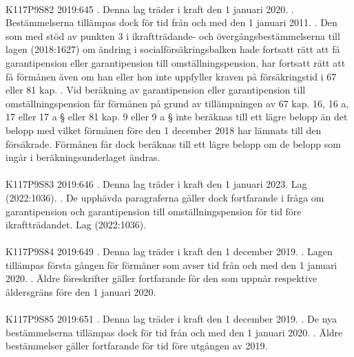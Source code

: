 \documentclass[a4paper,notitlepage,openany,10pt]{book}
\begin{document}
\paragraph*{}
{\tiny K117P9S82}
2019:645
. Denna lag träder i kraft den 1 januari 2020.
. Bestämmelserna tillämpas dock för tid från och med den 1 januari 2011.
. Den som med stöd av punkten 3 i ikraftträdande- och övergångsbestämmelserna till lagen (2018:1627) om ändring i socialförsäkringsbalken hade fortsatt rätt att få garantipension eller garantipension till omställningspension, har fortsatt rätt att få förmånen även om han eller hon inte uppfyller kraven på försäkringstid i 67 eller 81 kap.
. Vid beräkning av garantipension eller garantipension till omställningspension får förmånen på grund av tillämpningen av 67 kap. 16, 16 a, 17 eller 17 a § eller 81 kap. 9 eller 9 a § inte beräknas till ett lägre belopp än det belopp med vilket förmånen före den 1 december 2018 har lämnats till den försäkrade. Förmånen får dock beräknas till ett lägre belopp om de belopp som ingår i beräkningsunderlaget ändras.
\paragraph*{}
{\tiny K117P9S83}
2019:646
. Denna lag träder i kraft den 1 januari 2023.
Lag (2022:1036).
. De upphävda paragraferna gäller dock fortfarande i fråga om garantipension och garantipension till omställningspension för tid före ikraftträdandet.
Lag (2022:1036).
\paragraph*{}
{\tiny K117P9S84}
2019:649
. Denna lag träder i kraft den 1 december 2019.
. Lagen tillämpas första gången för förmåner som avser tid från och med den 1 januari 2020.
. Äldre föreskrifter gäller fortfarande för den som uppnår respektive åldersgräns före den 1 januari 2020.
\paragraph*{}
{\tiny K117P9S85}
2019:651
. Denna lag träder i kraft den 1 december 2019.
. De nya bestämmelserna tillämpas dock för tid från och med den 1 januari 2020.
. Äldre bestämmelser gäller fortfarande för tid före utgången av 2019.
\end{document}
